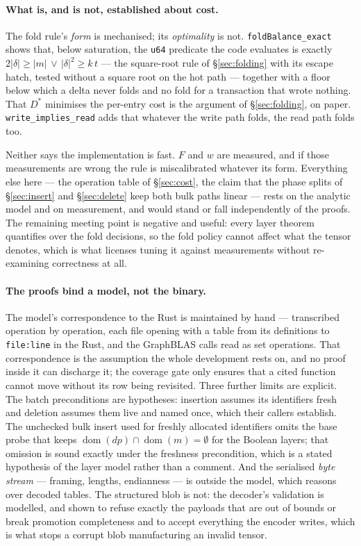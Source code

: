 \documentclass[11pt,a4paper]{article}
\theoremstyle{plain}
\theoremstyle{definition}
\theoremstyle{remark}
\newcommand{\dom}{\operatorname{dom}}
\begin{document}
\paragraph{What is, and is not, established about cost.} The fold rule's
\emph{form} is mechanised; its \emph{optimality} is not. \texttt{foldBalance\_exact}
shows that, below saturation, the \texttt{u64} predicate the code evaluates
is exactly $2|\delta| \ge |m| \,\vee\, |\delta|^2 \ge k\,t$ --- the square-root
rule of \S\ref{sec:folding} with its escape hatch, tested without a square root
on the hot path --- together with a floor below which a delta never folds and no
fold for a transaction that wrote nothing. That $D^{\ast}$ minimises the
per-entry cost is the argument of \S\ref{sec:folding}, on paper.
\texttt{write\_implies\_read} adds that whatever the write path folds, the read
path folds too.

Neither says the implementation is fast. $F$ and $w$ are measured, and if those
measurements are wrong the rule is miscalibrated whatever its form. Everything
else here --- the operation table of \S\ref{sec:cost}, the claim that the phase
splits of \S\ref{sec:insert} and \S\ref{sec:delete} keep both bulk paths linear
--- rests on the analytic model and on measurement, and would stand or fall
independently of the proofs. The remaining meeting point is negative and useful:
every layer theorem quantifies over the fold decisions, so the fold policy
cannot affect what the tensor denotes, which is what licenses tuning it against
measurements without re-examining correctness at all.

\paragraph{The proofs bind a model, not the binary.} The model's correspondence
to the Rust is maintained by hand --- transcribed operation by operation, each
file opening with a table from its definitions to \texttt{file:line} in the
Rust, and the GraphBLAS calls read as set operations. That correspondence is
the assumption the whole development rests on, and no proof inside it can
discharge it; the coverage gate only ensures that a cited function cannot move
without its row being revisited. Three further limits are explicit. The batch
preconditions are hypotheses: insertion assumes its identifiers fresh and
deletion assumes them live and named once, which their callers establish. The
unchecked bulk insert used for freshly allocated identifiers omits the base
probe that keeps $\dom(dp) \cap \dom(m) = \emptyset$ for the Boolean layers;
that omission is sound exactly under the freshness precondition, which is a
stated hypothesis of the layer model rather than a comment. And the serialised
\emph{byte stream} --- framing, lengths, endianness --- is outside the model,
which reasons over decoded tables. The structured blob is not: the decoder's
validation is modelled, and shown to refuse exactly the payloads that are out
of bounds or break promotion completeness and to accept everything the encoder
writes, which is what stops a corrupt blob manufacturing an invalid tensor.
\end{document}
